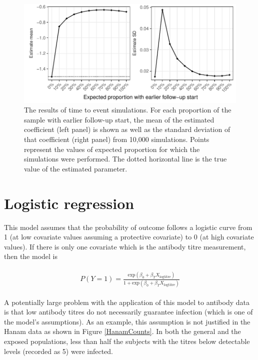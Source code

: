 \documentclass[12pt]{article}
\begin{document}
\pagebreak

\begin{figure}[htp]
	\centering
	\includegraphics[width=1\textwidth]{../cox-tarprop-plot/long.pdf}
	\caption{
	The results of time to event simulations. For each proportion of the sample with earlier follow-up start, the mean of the estimated coefficient (left panel) is shown as well as the standard deviation of that coefficient (right panel) from 10,000 simulations. Points represent the values of expected proportion for which the simulations were performed. The dotted horizontal line is the true value of the estimated parameter.
	}
	\label{CoxSimLong}
\end{figure}

\pagebreak
%
\section{Logistic regression}

This model assumes that the probability of outcome follows a logistic curve from 1 (at low covariate values assuming a protective covariate) to 0 (at high covariate values). If there is only one covariate which is the antibody titre measurement, then the model is

\begin{align*}
\begin{gathered}
P(Y=1) = \frac{\text{exp}(\beta_0 + \beta_T X_{\text{logtitre}})}{1 + \text{exp}(\beta_0 + \beta_T X_{\text{logtitre}})}
\end{gathered}
\end{align*}

A potentially large problem with the application of this model to antibody data is that low antibody titres do not necessarily guarantee infection (which is one of the model's assumptions). As an example, this assumption is not justified in the Hanam data as shown in Figure \ref{HanamCounts}. In both the general and the exposed populations, less than half the subjects with the titres below detectable levels (recorded as 5) were infected.
\end{document}
